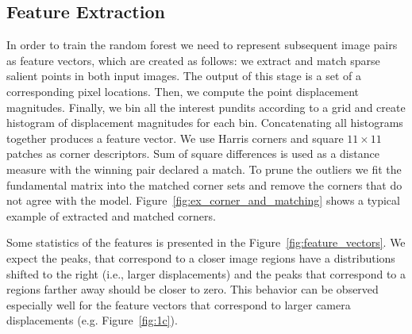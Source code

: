 \documentclass{article}
\begin{document}
\subsection{Feature Extraction}\label{sec:features}

In order to train the random forest we need to represent subsequent
image pairs as feature vectors, which are created as follows: we
extract and match sparse salient points in both input images.  The
output of this stage is a set of a corresponding pixel locations.
Then, we compute the point displacement magnitudes.  Finally, we bin
all the interest pundits according to a grid and create histogram of
displacement magnitudes for each bin.  Concatenating all histograms
together produces a feature vector. We use Harris corners and square
$11\times 11$ patches as corner descriptors. Sum of square differences
is used as a distance measure with the winning pair declared a match.
To prune the outliers we fit the fundamental matrix into the matched
corner sets and remove the corners that do not agree with the model.
Figure~\ref{fig:ex_corner_and_matching} shows a typical example of
extracted and matched corners.


Some statistics of the features is presented in the
Figure~\ref{fig:feature_vectors}. We expect the peaks, that correspond
to a closer image regions have a distributions shifted to the right
(i.e., larger displacements) and the peaks that correspond to a
regions farther away should be closer to zero.  This behavior can be
observed especially well for the feature vectors that correspond to
larger camera displacements (e.g. Figure~\ref{fig:1c}).
\end{document}
